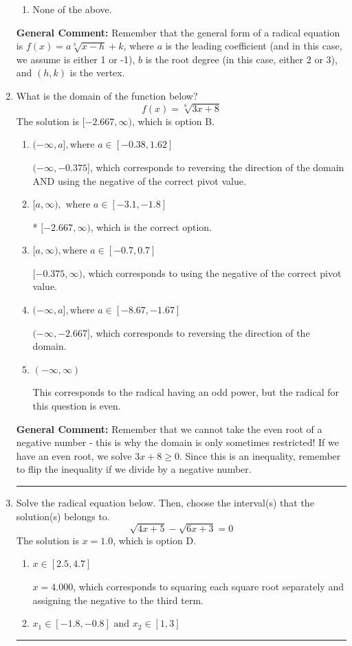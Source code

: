 \documentclass{extbook}[14pt]
\newcommand{\litem}[1]{\item #1

\rule{\textwidth}{0.4pt}}
\begin{document}
\begin{enumerate}
{\begin{enumerate}[label=\Alph*.]
\begin{multicols}{2}
\end{multicols}\item None of the above.\end{enumerate}
\textbf{General Comment:} Remember that the general form of a radical equation is $ f(x) = a \sqrt[b]{x - h} + k $, where $a$ is the leading coefficient (and in this case, we assume is either 1 or -1), $b$ is the root degree (in this case, either 2 or 3), and $(h, k)$ is the vertex.
}
\litem{
What is the domain of the function below?
\[ f(x) = \sqrt[8]{3 x + 8} \]The solution is \( [-2.667, \infty) \), which is option B.\begin{enumerate}[label=\Alph*.]
\item \( (-\infty, a], \text{where } a \in [-0.38, 1.62] \)

$(-\infty, -0.375]$, which corresponds to reversing the direction of the domain AND using the negative of the correct pivot value.
\item \( [a, \infty), \text{ where } a \in [-3.1, -1.8] \)

* $[-2.667, \infty)$, which is the correct option.
\item \( [a, \infty), \text{where } a \in [-0.7, 0.7] \)

$[-0.375, \infty)$, which corresponds to using the negative of the correct pivot value.
\item \( (-\infty, a], \text{where } a \in [-8.67, -1.67] \)

 $(-\infty, -2.667]$, which corresponds to reversing the direction of the domain.
\item \( (-\infty, \infty) \)

This corresponds to the radical having an odd power, but the radical for this question is even.
\end{enumerate}

\textbf{General Comment:} Remember that we cannot take the even root of a negative number - this is why the domain is only sometimes restricted! If we have an even root, we solve $3 x + 8 \geq 0$. Since this is an inequality, remember to flip the inequality if we divide by a negative number.
}
\litem{
Solve the radical equation below. Then, choose the interval(s) that the solution(s) belongs to.
\[ \sqrt{4 x + 5} - \sqrt{6 x + 3} = 0 \]The solution is \( x = 1.0 \), which is option D.\begin{enumerate}[label=\Alph*.]
\item \( x \in [2.5,4.7] \)

$x = 4.000$, which corresponds to squaring each square root separately and assigning the negative to the third term.
\item \( x_1 \in [-1.8, -0.8] \text{ and } x_2 \in [1,3] \)


\end{enumerate}}
\end{enumerate}
\end{document}
